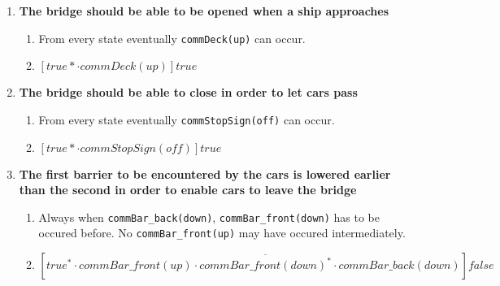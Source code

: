 \begin{enumerate}
	\item \textbf{The bridge should be able to be opened when a ship approaches}
	\begin{enumerate}
		\item From every state eventually \texttt{commDeck(up)} can occur.
		\item $[true* \cdot commDeck(up)]true$
	\end{enumerate}

	\item \textbf{The bridge should be able to close in order to let cars pass}
	\begin{enumerate}
		\item From every state eventually \texttt{commStopSign(off)} can occur.
		\item $[true* \cdot commStopSign(off)]true$
	\end{enumerate}

	\item \textbf{The first barrier to be encountered by the cars is lowered earlier than the second in order to enable cars to leave the bridge}
	\begin{enumerate}
		\item Always when \texttt{commBar\_back(down)}, \texttt{commBar\_front(down)} has to be occured before. No \texttt{commBar\_front(up)} may have occured intermediately.
		\item $[true^* \cdot commBar\_front(up) \cdot \overline{commBar\_front(down)^{*}} \cdot commBar\_back(down)]false$\\
	\end{enumerate}



\end{enumerate}
